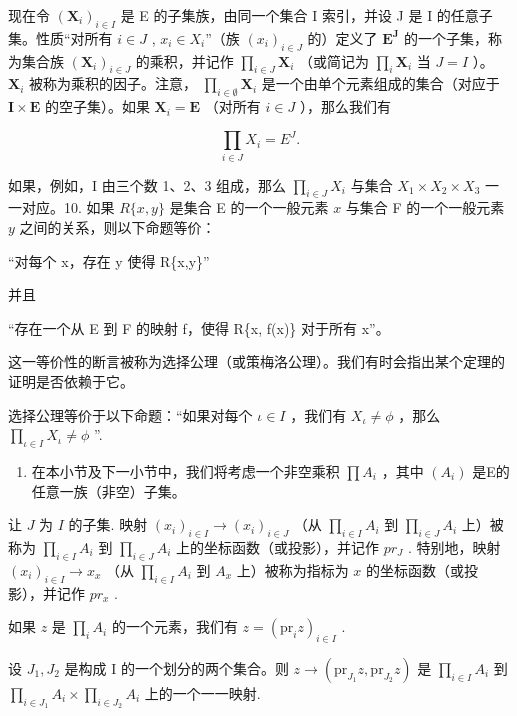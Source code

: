 现在令 \((\mathbf{X}_i)_{i\in I}\) 是 E 的子集族，由同一个集合 I 索引，并设 J 是 I 的任意子集。性质“对所有 \(i\in J\) , \(x_i\in X_i\)''（族 \((x_i)_{i\in J}\) 的）定义了 \(\mathbf{E}^{\mathbf{J}}\) 的一个子集，称为集合族 \((\mathbf{X}_i)_{i\in J}\) 的乘积，并记作 \(\prod_{i\in J}\mathbf{X}_i\) （或简记为 \(\prod_{i}\mathbf{X}_i\) 当 \(J = I\) ）。 \(\mathbf{X}_i\) 被称为乘积的因子。注意， \(\prod_{i\in \emptyset}\mathbf{X}_i\) 是一个由单个元素组成的集合（对应于 \(\mathbf{I}\times \mathbf{E}\) 的空子集）。如果 \(\mathbf{X}_i = \mathbf{E}\) （对所有 \(i\in J\) ），那么我们有

\[
\prod_ {i \in J} X _ {i} = E ^ {J}.
\]

如果，例如，I 由三个数 1、2、3 组成，那么 \(\prod_{i\in J}X_i\) 与集合 \(X_1\times X_2\times X_3\) 一一对应。10. 如果 \(R\{x,y\}\) 是集合 E 的一个一般元素 \(x\) 与集合 F 的一个一般元素 \(y\) 之间的关系，则以下命题等价：

“对每个 x，存在 y 使得 R\{x,y\}''

并且

“存在一个从 E 到 F 的映射 f，使得 R\{x, f(x)\} 对于所有 x''。

这一等价性的断言被称为选择公理（或策梅洛公理）。我们有时会指出某个定理的证明是否依赖于它。

选择公理等价于以下命题：“如果对每个 \(\iota\in I\) ，我们有 \(X_{\iota}\neq\phi\) ，那么 \(\prod_{\iota\in I}X_{\iota}\neq\phi\) ''.

\begin{enumerate}
\def\labelenumi{\arabic{enumi}.}
\setcounter{enumi}{10}
\tightlist
\item
  在本小节及下一小节中，我们将考虑一个非空乘积 \(\prod A_{i}\) ，其中 \((A_{i})\) 是E的任意一族（非空）子集。
\end{enumerate}

让 \(J\) 为 \(I\) 的子集. 映射 \((x_{i})_{i\in I}\to(x_{i})_{i\in J}\) （从 \(\prod_{i\in I}A_{i}\) 到 \(\prod_{i\in J}A_{i}\) 上）被称为 \(\prod_{i\in I}A_{i}\) 到 \(\prod_{i\in J}A_{i}\) 上的坐标函数（或投影），并记作 \(pr_{J}\) . 特别地，映射 \((x_{i})_{i\in I}\to x_{x}\) （从 \(\prod_{i\in I}A_{i}\) 到 \(A_{x}\) 上）被称为指标为 \(x\) 的坐标函数（或投影），并记作 \(pr_{x}\) .

如果 \(z\) 是 \(\prod_{i} A_{i}\) 的一个元素，我们有 \(z = (\mathrm{pr}_{i}z)_{i \in I}\) .

设 \(J_1, J_2\) 是构成 I 的一个划分的两个集合。则 \(z \to (\mathrm{pr}_{J_1}z, \mathrm{pr}_{J_2}z)\) 是 \(\prod_{i\in I} A_i\) 到 \(\prod_{i\in J_1} A_i \times \prod_{i\in J_2} A_i\) 上的一个一一映射.

